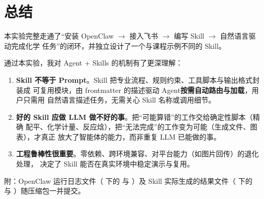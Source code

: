 \documentclass[UTF8,a4paper,12pt]{ctexart}
\begin{document}
\section{总结}

本实验完整走通了``安装 OpenClaw $\to$ 接入飞书 $\to$ 编写 Skill $\to$ 自然语言驱动完成化学
任务''的闭环，并独立设计了一个与课程示例不同的  Skill。

通过本实验，我对 Agent + Skills 的机制有了更深理解：

\begin{enumerate}
    \item \textbf{Skill 不等于 Prompt}。Skill 把专业流程、规则约束、工具脚本与输出格式封装成
          可复用模块，由 frontmatter 的描述驱动 Agent\textbf{按需自动路由与加载}，用户只需用
          自然语言描述任务，无需关心 Skill 名称或调用细节。
    \item \textbf{好的 Skill 应做 LLM 做不好的事}。把``可能算错''的工作交给确定性脚本（精确
          配平、化学计量、反应焓），把``无法完成''的工作变为可能（生成文件、图表），才真正
          放大了智能体的能力，而非重复 LLM 已能做的事。
    \item \textbf{工程鲁棒性很重要}。零依赖、跨环境兼容、对平台能力（如图片回传）的退化处理，
          决定了 Skill 能否在真实环境中稳定演示与复用。
\end{enumerate}

附：OpenClaw 运行日志文件（ 下的 
与 ）及 Skill 实际生成的结果文件（ 下的
 与 ）随压缩包一并提交。
\end{document}
